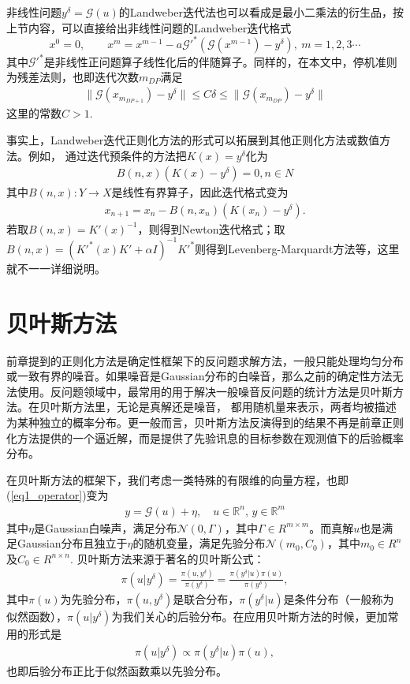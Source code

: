 \documentclass[a4paper,12pt,oneside,CJK]{cctbook}
\theoremstyle{definition}
\numberwithin{equation}{section}
\begin{document}
非线性问题$y^{\delta}=\mathcal{G}(u)$的Landweber迭代法也可以看成是最小二乘法的衍生品，按上节内容，可以直接给出非线性问题的Landweber迭代格式
$$
    x^0=0,\qquad x^m=x^{m-1}-a \mathcal{G}'^*(\mathcal{G}(x^{m-1})-y^{\delta}),~m=1,2,3\cdots
$$
其中$\mathcal{G}'^*$是非线性正问题算子线性化后的伴随算子。同样的，在本文中，停机准则为残差法则，也即迭代次数$m_{DP}$满足
\begin{align}\label{eq1_DP}
\|\mathcal{G}(x_{m_{DP+1}}) - y^{\delta}\| \leq C \delta \leq \|\mathcal{G}(x_{m_{DP}}) - y^{\delta}\|
\end{align}
这里的常数$C>1$.

事实上，Landweber迭代正则化方法的形式可以拓展到其他正则化方法或数值方法。例如，
通过迭代预条件的方法把$K(x)=y^{\delta}$化为
\begin{eqnarray*}
   B(n,x)(K(x)-y^{\delta})=0,n\in N
\end{eqnarray*}
其中$B(n,x):Y\rightarrow X$是线性有界算子，因此迭代格式变为
\begin{eqnarray*}
   x_{n+1}=x_n-B(n,x_n)(K(x_n)-y^{\delta}).
\end{eqnarray*}
若取$B(n,x)=K'(x)^{-1}$，则得到Newton迭代格式；取$B(n,x) = (K'^*(x)K'+\alpha I )^{-1} K'^*$则得到Levenberg-Marquardt方法等，这里就不一一详细说明。

\section{贝叶斯方法}
前章提到的正则化方法是确定性框架下的反问题求解方法，一般只能处理均匀分布或一致有界的噪音。如果噪音是Gaussian分布的白噪音，那么之前的确定性方法无法使用。反问题领域中，最常用的用于解决一般噪音反问题的统计方法是贝叶斯方法。在贝叶斯方法里，无论是真解还是噪音，
都用随机量来表示，两者均被描述为某种独立的概率分布。更一般而言，贝叶斯方法反演得到的结果不再是前章正则化方法提供的一个逼近解，而是提供了先验讯息的目标参数在观测值下的后验概率分布。

在贝叶斯方法的框架下，我们考虑一类特殊的有限维的向量方程，也即(\ref{eq1_operator})变为
\begin{eqnarray*}
    y=\mathcal{G}(u)+\eta, \quad u\in \mathbb{R}^n,\, y\in \mathbb{R}^m
\end{eqnarray*}
其中$\eta$是Gaussian白噪声，满足分布$\mathcal{N}(0,\Gamma)$，其中$\Gamma\in R^{m\times m}$。而真解$u$也是满足Gaussian分布且独立于$\eta$的随机变量，满足先验分布$\mathcal{N}(m_0,C_0)$，其中$m_0 \in R^n$及$C_0\in R^{n\times n}$.
贝叶斯方法来源于著名的贝叶斯公式：
\begin{eqnarray*}
    \pi(u|y^{\delta})=\frac{\pi(u,y^{\delta})}{\pi(y^{\delta})}=\frac{\pi(y^{\delta}|u)\pi(u)}{\pi(y^{\delta})},
\end{eqnarray*}
其中$\pi(u)$为先验分布，$\pi(u,y^{\delta})$是联合分布，$\pi(y^{\delta}|u)$是条件分布（一般称为似然函数），$\pi(u|y^{\delta})$为我们关心的后验分布。在应用贝叶斯方法的时候，更加常用的形式是
\begin{align}\label{eq1_bayes}
    \pi(u|y^{\delta}) \propto \pi(y^{\delta}|u)\pi(u),
\end{align}
也即后验分布正比于似然函数乘以先验分布。
\end{document}
